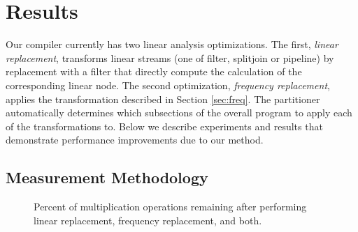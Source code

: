 \section{Results}
\label{sec:results}

Our compiler currently has two linear analysis optimizations. The
first, {\it linear replacement}, transforms linear streams 
(one of filter, splitjoin or pipeline) by replacement with a filter 
that directly compute the calculation of the corresponding linear node. 
The second optimization, {\it frequency replacement}, applies the 
transformation described in Section \ref{sec:freq}. The partitioner 
automatically determines which subsections of the overall program to apply
each of the transformations to. Below we describe experiments and results 
that demonstrate performance improvements due to our method.

\subsection{Measurement Methodology}


\begin{figure}[t]
\center
\epsfxsize=3.2in
\vspace{-6pt}
\caption{Percent of multiplication operations remaining after performing linear replacement, frequency replacement, and both.}
\label{fig:linear-freq-both}
\vspace{-12pt}
\end{figure}

